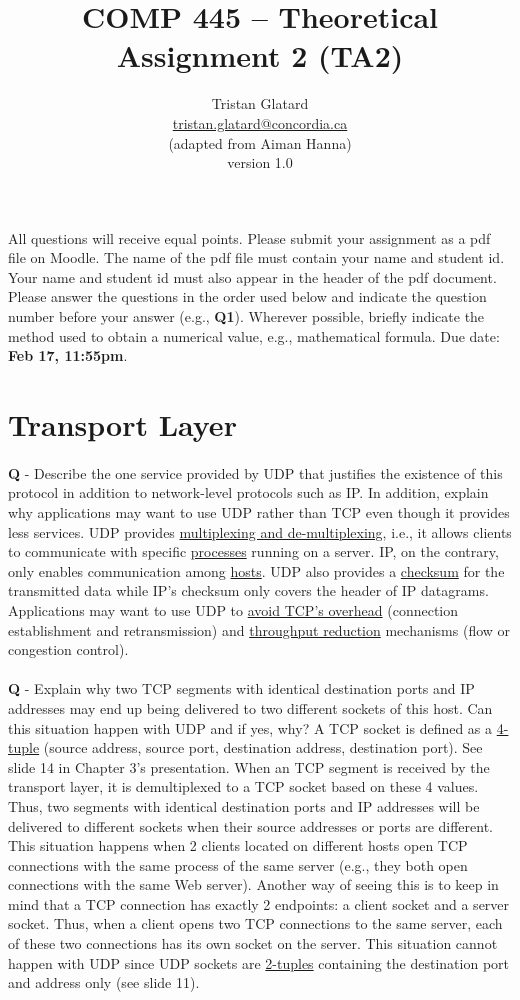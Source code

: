 \documentclass{llncs}
\title{COMP 445 -- Theoretical Assignment 2 (TA2)}
\author{Tristan Glatard\\
  \href{mailto:tristan.glatard@concordia.ca}{tristan.glatard@concordia.ca}\\
  \vspace*{0.3cm}
  (adapted from Aiman Hanna)\\
  version 1.0
  }
\institute{Concordia University\\
  Department of Computer Science and Software Engineering}
\newcounter{ques}
\newcommand{\quest}[2]{\paragraph{}\textbf{Q\theques} - #1\stepcounter{ques} }
\newcommand{\answer}[1]{\color{red}\textit{#1}\color{black}}
\begin{document}
\maketitle

All questions will receive equal points. Please submit your assignment
as a pdf file on Moodle. The name of the pdf file must contain your
name and student id. Your name and student id must also appear in the
header of the pdf document. Please answer the questions in the order
used below and indicate the question number before your answer (e.g.,
\textbf{Q1}). Wherever possible, briefly indicate the method used to
obtain a numerical value, e.g., mathematical formula. Due date:
\textbf{Feb 17, 11:55pm}.

\section{Transport Layer}

\quest{Describe the one service provided by UDP that justifies the
  existence of this protocol in addition to network-level protocols
  such as IP. In addition, explain why applications may want to use UDP
  rather than TCP even though it provides less services.}

\answer{UDP provides \underline{multiplexing and de-multiplexing},
  i.e., it allows clients to communicate with specific
  \underline{processes} running on a server. IP, on the contrary, only
  enables communication among \underline{hosts}. UDP also provides a
  \underline{checksum} for the transmitted data while IP's checksum
  only covers the header of IP datagrams.  Applications may want to
  use UDP to \underline{avoid TCP's overhead} (connection
  establishment and retransmission) and \underline{throughput reduction}
  mechanisms (flow or congestion control).}

\quest{Explain why two TCP segments with identical destination ports
  and IP addresses may end up being delivered to two different sockets
  of this host. Can this situation happen with UDP and if yes, why?}

\answer{A TCP socket is defined as a \underline{4-tuple} (source address, source
  port, destination address, destination port). See slide 14 in
  Chapter 3's presentation. When an TCP segment is received by the
  transport layer, it is demultiplexed to a TCP socket based on these
  4 values. Thus, two segments with identical destination ports
  and IP addresses will be delivered to different sockets when their
  source addresses or ports are different.  This situation happens
  when 2 clients located on different hosts open TCP connections with
  the same process of the same server (e.g., they both open
  connections with the same Web server). Another way of seeing this is
  to keep in mind that a TCP connection has exactly 2 endpoints: a
  client socket and a server socket. Thus, when a client opens two
  TCP connections to the same server, each of these two connections
  has its own socket on the server. This situation cannot happen with
  UDP since UDP sockets are \underline{2-tuples} containing the destination port
  and address only (see slide 11).}
\end{document}
